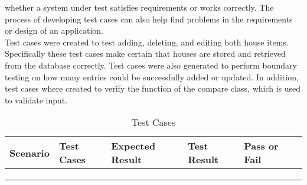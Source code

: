 \documentclass[12pt,a4paper]{article}
\begin{document}
{whether a system under test satisfies requirements or works correctly. The process of
developing test cases can also help find problems in the requirements or design of an
application.\\Test cases were created to test adding, deleting, and editing both house items.
Specifically these test cases make certain that houses are stored and retrieved
from the database correctly. Test cases were also generated to perform boundary testing
on how many entries could be successfully added or updated. In addition, test cases where
created to verify the function of the compare class, which is used to validate input.	

\begin{table}[H]
\center
\renewcommand\arraystretch{0}
		\label{tab:Test}
\caption{\hspace{0.4em}Test Cases}
\vspace{0.2cm}
\begin{tabular}{M{2cm}|M{3cm}|M{3cm}|M{3cm}|M{1.5cm}N}
\hline
\textbf{Scenario} &
{\textbf{Test Cases}} & 
{\textbf{Expected Result}} & %
{\textbf{Test Result}} &
\textbf{Pass or Fail} & \\ [10pt]
\hline
\fontsize {10}{8}\selectfont {} & 
\fontsize {10}{8}\selectfont {Enter null in
mandatory fields.} & 
\fontsize {10}{8}\selectfont {It should not do the
registration and
show error.} & 
\fontsize {10}{8}\selectfont {It will show
message that please
fill out this field.} & 
\fontsize {10}{8}\selectfont {Pass} &\\[30pt]

\fontsize {10}{8}\selectfont {Registration} & 
\fontsize {10}{8}\selectfont {Enter incorrect data} & 
\fontsize {10}{8}\selectfont {It should not do the
registration and
show error.} & 
\fontsize {10}{8}\selectfont {Email: Please enter
an email.
Password:
Password.
do not match} & 
\fontsize {10}{8}\selectfont {Pass} &\\[35pt]

\fontsize {10}{8}\selectfont {} & 
\fontsize {10}{8}\selectfont {Enter correct data of
all required field} & 
\fontsize {10}{8}\selectfont {It should lead to
successfully
registration} & 
\fontsize {10}{8}\selectfont {It will show the
message of
successfully
registrattion} & 
\fontsize {10}{8}\selectfont {Pass} &\\[40pt]
\hline%


\end{tabular}
\end{table}}
\end{document}
